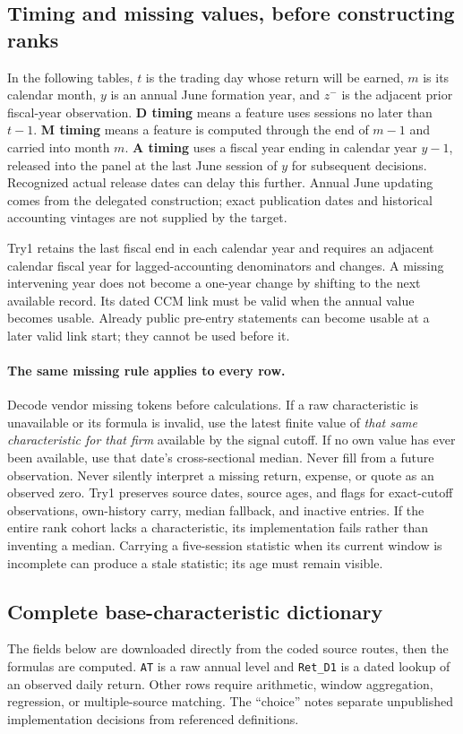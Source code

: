 \documentclass[11pt]{article}
\begin{document}
\subsection{Timing and missing values, before constructing ranks}
In the following tables, $t$ is the trading day whose return will be earned, $m$ is its calendar month, $y$ is an annual June formation year, and $z^{-}$ is the adjacent prior fiscal-year observation. \textbf{D timing} means a feature uses sessions no later than $t-1$. \textbf{M timing} means a feature is computed through the end of $m-1$ and carried into month $m$. \textbf{A timing} uses a fiscal year ending in calendar year $y-1$, released into the panel at the last June session of $y$ for subsequent decisions. Recognized actual release dates can delay this further. Annual June updating comes from the delegated construction; exact publication dates and historical accounting vintages are not supplied by the target.

Try1 retains the last fiscal end in each calendar year and requires an adjacent calendar fiscal year for lagged-accounting denominators and changes. A missing intervening year does not become a one-year change by shifting to the next available record. Its dated CCM link must be valid when the annual value becomes usable. Already public pre-entry statements can become usable at a later valid link start; they cannot be used before it.

\paragraph{The same missing rule applies to every row.}
Decode vendor missing tokens before calculations. If a raw characteristic is unavailable or its formula is invalid, use the latest finite value of \emph{that same characteristic for that firm} available by the signal cutoff. If no own value has ever been available, use that date's cross-sectional median. Never fill from a future observation. Never silently interpret a missing return, expense, or quote as an observed zero. Try1 preserves source dates, source ages, and flags for exact-cutoff observations, own-history carry, median fallback, and inactive entries. If the entire rank cohort lacks a characteristic, its implementation fails rather than inventing a median. Carrying a five-session statistic when its current window is incomplete can produce a stale statistic; its age must remain visible.

\subsection{Complete base-characteristic dictionary}
The fields below are downloaded directly from the coded source routes, then the formulas are computed. \texttt{AT} is a raw annual level and \texttt{Ret\_D1} is a dated lookup of an observed daily return. Other rows require arithmetic, window aggregation, regression, or multiple-source matching. The ``choice'' notes separate unpublished implementation decisions from referenced definitions.
\end{document}
